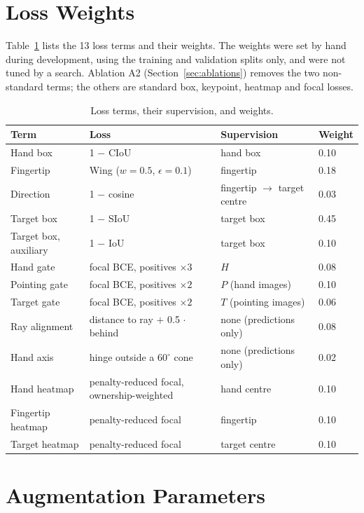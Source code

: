 \section{Loss Weights}\label{app:weights}

Table~\ref{tab:weights} lists the 13 loss terms and their weights. The weights were set by hand during development, using the training and validation splits only, and were not tuned by a search. Ablation A2 (Section~\ref{sec:ablations}) removes the two non-standard terms; the others are standard box, keypoint, heatmap and focal losses.

\begin{table}[h]
  \caption{Loss terms, their supervision, and weights.}
  \label{tab:weights}
  \footnotesize
  \begin{tabular}{llll}
    \toprule
    Term & Loss & Supervision & Weight \\
    \midrule
    Hand box & 1 $-$ CIoU & hand box & 0.10 \\
    Fingertip & Wing ($w{=}0.5$, $\epsilon{=}0.1$) & fingertip & 0.18 \\
    Direction & 1 $-$ cosine & fingertip $\to$ target centre & 0.03 \\
    Target box & 1 $-$ SIoU & target box & 0.45 \\
    Target box, auxiliary & 1 $-$ IoU & target box & 0.10 \\
    Hand gate & focal BCE, positives $\times3$ & $H$ & 0.08 \\
    Pointing gate & focal BCE, positives $\times2$ & $P$ (hand images) & 0.10 \\
    Target gate & focal BCE, positives $\times2$ & $T$ (pointing images) & 0.06 \\
    Ray alignment & distance to ray $+$ 0.5 $\cdot$ behind & none (predictions only) & 0.08 \\
    Hand axis & hinge outside a $60^\circ$ cone & none (predictions only) & 0.02 \\
    Hand heatmap & penalty-reduced focal, ownership-weighted & hand centre & 0.10 \\
    Fingertip heatmap & penalty-reduced focal & fingertip & 0.10 \\
    Target heatmap & penalty-reduced focal & target centre & 0.10 \\
    \bottomrule
  \end{tabular}
\end{table}

\section{Augmentation Parameters}\label{app:aug}

